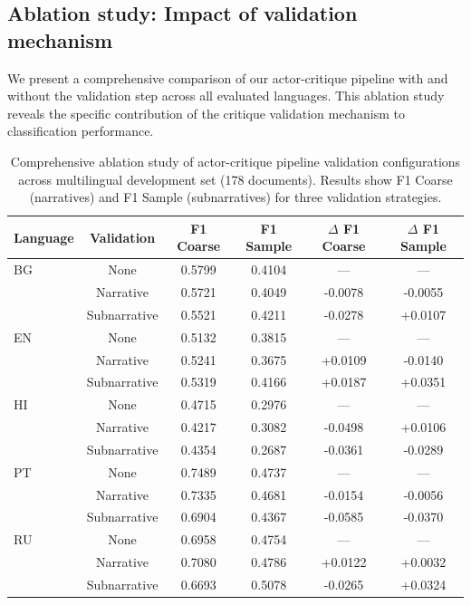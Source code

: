\subsection{Ablation study: Impact of validation mechanism}

We present a comprehensive comparison of our actor-critique pipeline with and without the validation step across all evaluated languages. This ablation study reveals the specific contribution of the critique validation mechanism to classification performance.

\begin{table}[ht]
\centering
\caption{Comprehensive ablation study of actor-critique pipeline validation configurations across multilingual development set (178 documents). Results show F1 Coarse (narratives) and F1 Sample (subnarratives) for three validation strategies.}
\label{tab:actor_critique_ablation}
\small
\begin{tabular}{lccccc}
\hline
\textbf{Language} & \textbf{Validation} & \textbf{F1 Coarse} & \textbf{F1 Sample} & \textbf{$\Delta$ F1 Coarse} & \textbf{$\Delta$ F1 Sample} \\
\hline
BG & None & 0.5799 & 0.4104 & --- & --- \\
   & Narrative & 0.5721 & 0.4049 & -0.0078 & -0.0055 \\
   & Subnarrative & 0.5521 & 0.4211 & -0.0278 & +0.0107 \\
\hline
EN & None & 0.5132 & 0.3815 & --- & --- \\
   & Narrative & 0.5241 & 0.3675 & +0.0109 & -0.0140 \\
   & Subnarrative & 0.5319 & 0.4166 & +0.0187 & +0.0351 \\
\hline
HI & None & 0.4715 & 0.2976 & --- & --- \\
   & Narrative & 0.4217 & 0.3082 & -0.0498 & +0.0106 \\
   & Subnarrative & 0.4354 & 0.2687 & -0.0361 & -0.0289 \\
\hline
PT & None & 0.7489 & 0.4737 & --- & --- \\
   & Narrative & 0.7335 & 0.4681 & -0.0154 & -0.0056 \\
   & Subnarrative & 0.6904 & 0.4367 & -0.0585 & -0.0370 \\
\hline
RU & None & 0.6958 & 0.4754 & --- & --- \\
   & Narrative & 0.7080 & 0.4786 & +0.0122 & +0.0032 \\
   & Subnarrative & 0.6693 & 0.5078 & -0.0265 & +0.0324 \\

\end{tabular}
\end{table}
